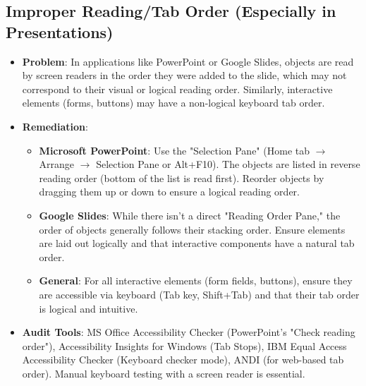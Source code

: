 \subsection{Improper Reading/Tab Order (Especially in Presentations)}
\begin{itemize}
    \item \textbf{Problem}: In applications like PowerPoint or Google Slides, objects are read by screen readers in the order they were added to the slide, which may not correspond to their visual or logical reading order. Similarly, interactive elements (forms, buttons) may have a non-logical keyboard tab order.
    \item \textbf{Remediation}:
        \begin{itemize}
            \item \textbf{Microsoft PowerPoint}: Use the "Selection Pane" (Home tab $\rightarrow$ Arrange $\rightarrow$ Selection Pane or Alt+F10). The objects are listed in reverse reading order (bottom of the list is read first). Reorder objects by dragging them up or down to ensure a logical reading order.
            \item \textbf{Google Slides}: While there isn't a direct "Reading Order Pane," the order of objects generally follows their stacking order. Ensure elements are laid out logically and that interactive components have a natural tab order.
            \item \textbf{General}: For all interactive elements (form fields, buttons), ensure they are accessible via keyboard (Tab key, Shift+Tab) and that their tab order is logical and intuitive.
        \end{itemize}
    \item \textbf{Audit Tools}: MS Office Accessibility Checker (PowerPoint's "Check reading order"), Accessibility Insights for Windows (Tab Stops), IBM Equal Access Accessibility Checker (Keyboard checker mode), ANDI (for web-based tab order). Manual keyboard testing with a screen reader is essential.
\end{itemize}

